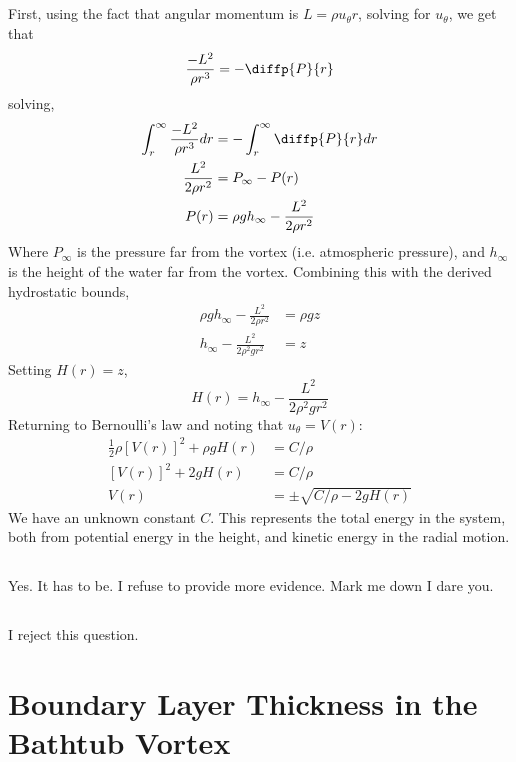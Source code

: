 \documentclass{article}
\begin{document}
\subsection{}
First, using the fact that angular momentum is \(L = \rho u_\theta r\), solving for \(u_\theta\), we get that
\[\frac{-L^2}{\rho r^3} = - \diffp{P}{r} \]
solving,
\begin{align*}
\int_r^\infty \frac{-L^2}{\rho r^3} dr &= - \int_r^\infty \diffp{P}{r} dr \\
\frac{L^2}{2 \rho r^2} &= P_\infty - P(r) \\
P(r) &= \rho g h_\infty - \frac{L^2}{2 \rho r^2}
\end{align*}
Where \(P_\infty\) is the pressure far from the vortex (i.e. atmospheric
pressure), and \(h_\infty\) is the height of the water far from the
vortex. Combining this with the derived hydrostatic bounds,
\begin{align*}
    \rho g h_\infty - \frac{L^2}{2 \rho r^2} &= \rho g z \\
    h_\infty - \frac{L^2}{2 \rho^2 g r^2} &= z
\end{align*}
Setting \(H(r) = z\),
\[ H(r) = h_\infty - \frac{L^2}{2 \rho^2 g r^2}\]
Returning to Bernoulli's law and noting that \(u_\theta = V(r)\):
\begin{align*}
    \frac{1}{2}\rho \left[V(r)\right]^2 + \rho g H(r) &= C/\rho \\
    \left[V(r)\right]^2 + 2 g H(r) &= C/\rho \\
    V(r) &= \pm \sqrt{C/\rho - 2g H(r)}
\end{align*}
We have an unknown constant \(C\). This represents the total energy in the system, both from potential energy in the height, and kinetic energy in the radial motion.

\subsection{}
Yes. It has to be. I refuse to provide more evidence. Mark me down I dare you.

\subsection{}
I reject this question.

\section{Boundary Layer Thickness in the Bathtub Vortex}

\subsection{}
\subsection{}
\subsection{}
\subsection{}
\subsection{}
\end{document}
